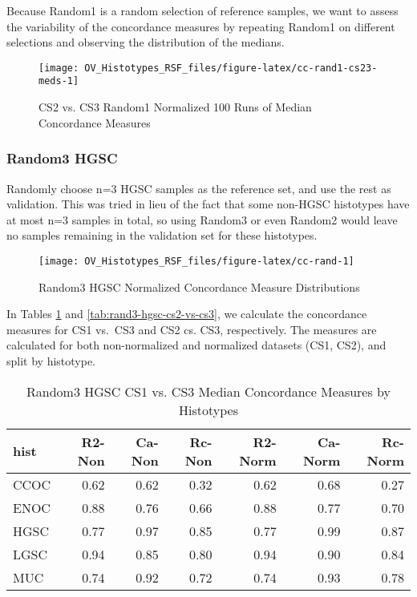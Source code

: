 \documentclass[
]{report}
\begin{document}
Because Random1 is a random selection of reference samples, we want to assess the variability of the concordance measures by repeating Random1 on different selections and observing the distribution of the medians.

\begin{figure}[H]

{\centering \texttt{[image: OV\_Histotypes\_RSF\_files/figure-latex/cc-rand1-cs23-meds-1]} 

}

\caption{CS2 vs. CS3 Random1 Normalized 100 Runs of Median Concordance Measures}\label{fig:cc-rand1-cs23-meds}
\end{figure}

\hypertarget{random3-hgsc}{%
\subsubsection{Random3 HGSC}\label{random3-hgsc}}

Randomly choose n=3 HGSC samples as the reference set, and use the rest as validation. This was tried in lieu of the fact that some non-HGSC histotypes have at most n=3 samples in total, so using Random3 or even Random2 would leave no samples remaining in the validation set for these histotypes.

\begin{figure}[H]

{\centering \texttt{[image: OV\_Histotypes\_RSF\_files/figure-latex/cc-rand-1]} 

}

\caption{Random3 HGSC Normalized Concordance Measure Distributions}\label{fig:cc-rand}
\end{figure}

In Tables \ref{tab:rand3-hgsc-cs1-vs-cs3} and \ref{tab:rand3-hgsc-cs2-vs-cs3}, we calculate the concordance measures for CS1 vs.~CS3 and CS2 cs. CS3, respectively. The measures are calculated for both non-normalized and normalized datasets (CS1, CS2), and split by histotype.

\begin{table}

\caption{\label{tab:rand3-hgsc-cs1-vs-cs3}Random3 HGSC CS1 vs. CS3 Median Concordance Measures by Histotypes}
\centering
\begin{tabular}[t]{l|r|r|r|r|r|r}
\hline
hist & R2-Non & Ca-Non & Rc-Non & R2-Norm & Ca-Norm & Rc-Norm\\
\hline
CCOC & 0.62 & 0.62 & 0.32 & 0.62 & 0.68 & 0.27\\
\hline
ENOC & 0.88 & 0.76 & 0.66 & 0.88 & 0.77 & 0.70\\
\hline
HGSC & 0.77 & 0.97 & 0.85 & 0.77 & 0.99 & 0.87\\
\hline
LGSC & 0.94 & 0.85 & 0.80 & 0.94 & 0.90 & 0.84\\
\hline
MUC & 0.74 & 0.92 & 0.72 & 0.74 & 0.93 & 0.78\\
\hline
\end{tabular}
\end{table}
\end{document}
